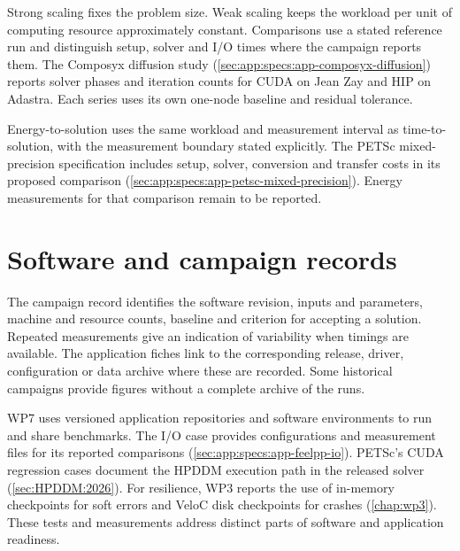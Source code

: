 Strong scaling fixes the problem size. Weak scaling keeps the workload
per unit of computing resource approximately constant. Comparisons use
a stated reference run and distinguish setup, solver and I/O times
where the campaign reports them. The Composyx diffusion study
(\cref{sec:app:specs:app-composyx-diffusion}) reports solver phases and
iteration counts for CUDA on Jean Zay and HIP on Adastra. Each series
uses its own one-node baseline and residual tolerance.

Energy-to-solution uses the same workload and measurement interval as
time-to-solution, with the measurement boundary stated explicitly. The
PETSc mixed-precision specification includes setup, solver, conversion
and transfer costs in its proposed comparison
(\cref{sec:app:specs:app-petsc-mixed-precision}). Energy measurements for
that comparison remain to be reported.

\section{Software and campaign records}
\label{sec:benchmark-campaign-records}

The campaign record identifies the software revision, inputs and
parameters, machine and resource counts, baseline and criterion for
accepting a solution. Repeated measurements give an indication of
variability when timings are available. The application fiches link
to the corresponding release, driver, configuration or data archive
where these are recorded. Some historical campaigns provide figures
without a complete archive of the runs.

WP7 uses versioned application repositories and software environments
to run and share benchmarks. The I/O case provides configurations and
measurement files for its reported comparisons
(\cref{sec:app:specs:app-feelpp-io}). PETSc's CUDA regression cases
document the HPDDM execution path in the released solver
(\cref{sec:HPDDM:2026}). For resilience, WP3 reports the use of in-memory
checkpoints for soft errors and VeloC disk checkpoints for crashes
(\cref{chap:wp3}). These tests and measurements address distinct
parts of software and application readiness.
